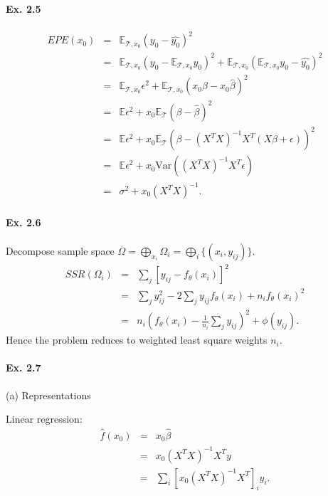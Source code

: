 \paragraph*{Ex. 2.5}
\begin{eqnarray*}
	EPE(x_0) &=& \mathbb{E}_{\mathcal{T}, x_0}(y_0 - \hat{y_0})^2 \\
	&=& \mathbb{E}_{\mathcal{T}, x_0}(y_0 - \mathbb{E}_{\mathcal{T}, x_0}y_0)^2 + \mathbb{E}_{\mathcal{T}, x_0}(\mathbb{E}_{\mathcal{T}, x_0}y_0- \hat{y_0})^2 \\
	&=& \mathbb{E}_{\mathcal{T}, x_0}\epsilon^2 + \mathbb{E}_{\mathcal{T}, x_0}(x_0\beta - x_0\hat{\beta})^2 \\
	&=& \mathbb{E}\epsilon^2 +  x_0\mathbb{E}_{\mathcal{T}}(\beta - \hat{\beta})^2 \\
	&=& \mathbb{E}\epsilon^2 +  x_0\mathbb{E}_{\mathcal{T}}\left(\beta - (X^TX)^{-1}X^{T}(X\beta + \epsilon)\right)^2 \\
	&=& \mathbb{E}\epsilon^2 +  x_0\mbox{Var}\left((X^TX)^{-1}X^{T}\epsilon\right) \\
	&=& \sigma^2 +  x_0 (X^TX)^{-1}.
\end{eqnarray*}

\paragraph*{Ex. 2.6}
Decompose sample space $\Omega=\bigoplus_{x_i}\Omega_i=\bigoplus_{i}\{(x_i, y_{ij})\}.$
\begin{eqnarray*}
	SSR(\Omega_i) &=& \sum_{j}[y_{ij} - f_{\theta}(x_{i})]^2 \\
	&=&\sum_{j}y_{ij}^2-2 \sum_{j}y_{ij}f_{\theta}(x_{i}) + n_if_{\theta}(x_{i})^2\\
	&=&n_{i}\left(f_{\theta}(x_{i}) - \frac{1}{n_{i}}\sum_{j}y_{ij}\right)^2 + \phi(y_{ij}).
\end{eqnarray*}
Hence the problem reduces to weighted least square weights $n_{i}$.

\paragraph*{Ex. 2.7}
(a) Representations

Linear regression:
\begin{eqnarray*}
	\hat{f}(x_0)&=&x_0\hat{\beta} \\
	&=& x_0 (X^{T}X)^{-1} X^{T}y \\
	&=& \sum_{i} [x_0 (X^{T}X)^{-1} X^{T}]_{i}y_{i}.
\end{eqnarray*}

